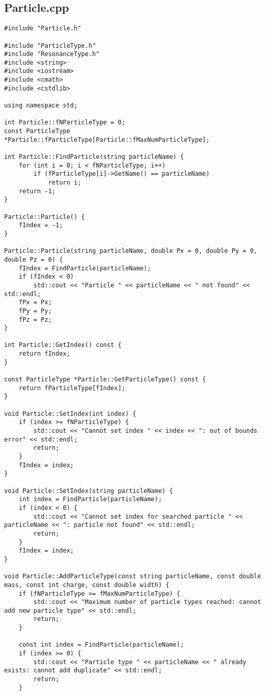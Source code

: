 \documentclass{article}
\begin{document}
\subsection*{Particle.cpp}
\begin{verbatim}
#include "Particle.h"

#include "ParticleType.h"
#include "ResonanceType.h"
#include <string>
#include <iostream>
#include <cmath>
#include <cstdlib>

using namespace std;

int Particle::fNParticleType = 0;
const ParticleType *Particle::fParticleType[Particle::fMaxNumParticleType];

int Particle::FindParticle(string particleName) {
    for (int i = 0; i < fNParticleType; i++)
        if (fParticleType[i]->GetName() == particleName)
            return i;
    return -1;
}

Particle::Particle() {
    fIndex = -1;
}

Particle::Particle(string particleName, double Px = 0, double Py = 0, double Pz = 0) {
    fIndex = FindParticle(particleName);
    if (fIndex < 0)
        std::cout << "Particle " << particleName << " not found" << std::endl;
    fPx = Px;
    fPy = Py;
    fPz = Pz;
}

int Particle::GetIndex() const {
    return fIndex;
}

const ParticleType *Particle::GetParticleType() const {
    return fParticleType[fIndex];
}

void Particle::SetIndex(int index) {
    if (index >= fNParticleType) {
        std::cout << "Cannot set index " << index << ": out of bounds error" << std::endl;
        return;
    }
    fIndex = index;
}

void Particle::SetIndex(string particleName) {
    int index = FindParticle(particleName);
    if (index < 0) {
        std::cout << "Cannot set index for searched particle " << particleName << ": particle not found" << std::endl;
        return;
    }
    fIndex = index;
}

void Particle::AddParticleType(const string particleName, const double mass, const int charge, const double width) {
    if (fNParticleType >= fMaxNumParticleType) {
        std::cout << "Maximum number of particle types reached: cannot add new particle type" << std::endl;
        return;
    }

    const int index = FindParticle(particleName);
    if (index >= 0) {
        std::cout << "Particle type " << particleName << " already exists: cannot add duplicate" << std::endl;
        return;
    }


\end{verbatim}
\end{document}
